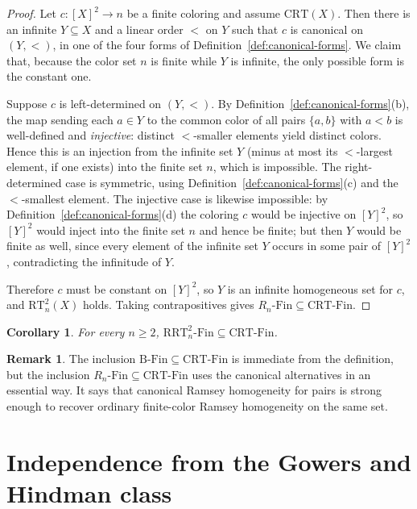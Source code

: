 \documentclass[10pt,a4paper]{amsart}
\newtheorem{corollary}[theorem]{Corollary}
\theoremstyle{definition}
\newtheorem{remark}[theorem]{Remark}
\newcommand{\BFin}{\mathrm{B\text{-}Fin}}
\newcommand{\RnFin}[1]{R_{#1}\text{-}\mathrm{Fin}}
\newcommand{\RRT}{\mathrm{RRT}}
\newcommand{\CRT}{\mathrm{CRT}}
\newcommand{\RT}{\mathrm{RT}}
\newcommand{\RRTFin}[2]{\RRT^{#1}_{#2}\text{-}\mathrm{Fin}}
\newcommand{\CRTFin}{\CRT\text{-}\mathrm{Fin}}
\begin{document}
\begin{proof}
Let \(c:[X]^2\to n\) be a finite coloring and assume \(\CRT(X)\).  Then there is an infinite \(Y\subseteq X\) and a linear order \(<\) on \(Y\) such that \(c\) is canonical on \((Y,<)\), in one of the four forms of Definition~\ref{def:canonical-forms}.  We claim that, because the color set \(n\) is finite while \(Y\) is infinite, the only possible form is the constant one.

Suppose \(c\) is left-determined on \((Y,<)\).  By Definition~\ref{def:canonical-forms}(b), the map sending each \(a\in Y\) to the common color of all pairs \(\{a,b\}\) with \(a<b\) is well-defined and \emph{injective}: distinct \(<\)-smaller elements yield distinct colors.  Hence this is an injection from the infinite set \(Y\) (minus at most its \(<\)-largest element, if one exists) into the finite set \(n\), which is impossible.  The right-determined case is symmetric, using Definition~\ref{def:canonical-forms}(c) and the \(<\)-smallest element.  The injective case is likewise impossible: by Definition~\ref{def:canonical-forms}(d) the coloring \(c\) would be injective on \([Y]^2\), so \([Y]^2\) would inject into the finite set \(n\) and hence be finite; but then \(Y\) would be finite as well, since every element of the infinite set \(Y\) occurs in some pair of \([Y]^2\), contradicting the infinitude of \(Y\).

Therefore \(c\) must be constant on \([Y]^2\), so \(Y\) is an infinite homogeneous set for \(c\), and \(\RT^2_n(X)\) holds.  Taking contrapositives gives \(\RnFin{n}\subseteq\CRTFin\).
\end{proof}

\begin{corollary}
For every \(n\geq 2\), \(\RRTFin{2}{n}\subseteq \CRTFin\).
\end{corollary}

\begin{remark}
The inclusion \(\BFin\subseteq\CRTFin\) is immediate from the definition, but the inclusion \(\RnFin{n}\subseteq\CRTFin\) uses the canonical alternatives in an essential way.  It says that canonical Ramsey homogeneity for pairs is strong enough to recover ordinary finite-color Ramsey homogeneity on the same set.
\end{remark}

\section{Independence from the Gowers and Hindman class}\label{sec:independence}
\end{document}
